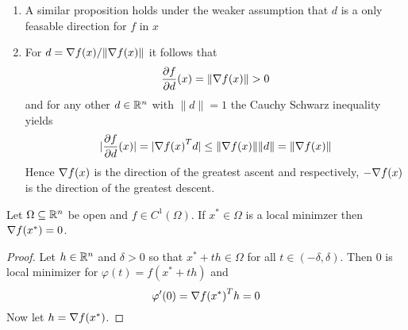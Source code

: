 \begin{remark}\hfill
    \begin{enumerate}
        \item A similar proposition holds under the weaker assumption that \( d \) is a only feasable direction 
            for \( f \) in \( x \)

        \item For \( d = \nabla{f(x)}/\| \nabla{f(x)}\| \) it follows that
            \[
                \frac{\partial f}{\partial d}(x) = \|\nabla{f(x)}\| > 0
            \]
            and for any other \( d \in \mathbb{R}^n \) with \( \|d\| = 1 \) the Cauchy Schwarz inequality yields
            \[
                |\frac{\partial f}{\partial d}(x)| = |\nabla{f(x)}^T d| \le \|\nabla{f(x)}\| \|d\| = 
                    \|\nabla{f(x)}\|
            \]
            Hence \( \nabla{f(x)} \) is the direction of the greatest ascent and respectively, 
            \( -\nabla{f(x)} \) is the direction of the greatest descent.
    \end{enumerate}
\end{remark}
\bigskip

\begin{theorem}\label{thm:fonc}
Let \( \Omega \subseteq \mathbb{R}^n \) be open and \( f \in C^1(\Omega) \). If \( x^* \in \Omega \) is a local minimzer then
\( \nabla f(x^*) = 0 \).
\end{theorem}

\begin{proof}
Let \( h \in \mathbb{R}^n \) and \( \delta > 0 \) so that \( x^* + th \in \Omega \) for all \( t \in (-\delta, \delta) \). 
Then \( 0 \) is local minimizer for \( \varphi(t) = f(x^* + th) \) and
\[
    \varphi^\prime(0) = {\nabla f(x^*)}^T h = 0
\]
Now let \( h = \nabla f(x^*) \). 
\end{proof}
\bigskip

